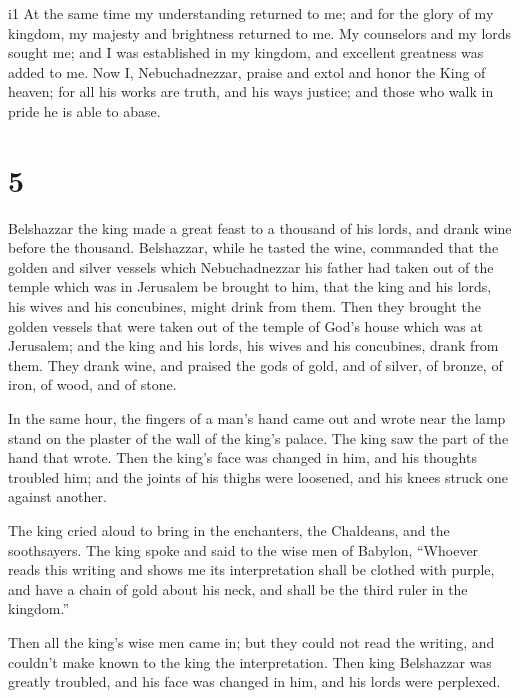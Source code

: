 i1 At the same time my understanding returned to me; and
for the glory of my kingdom, my majesty and brightness returned to me.
My counselors and my lords sought me; and I was established in my
kingdom, and excellent greatness was added to me.  Now I,
Nebuchadnezzar, praise and extol and honor the King of heaven; for all
his works are truth, and his ways justice; and those who walk in pride
he is able to abase.

\hypertarget{section-4}{%
\section{5}\label{section-4}}

 Belshazzar the king made a great feast to a thousand of his
lords, and drank wine before the thousand.  Belshazzar,
while he tasted the wine, commanded that the golden and silver vessels
which Nebuchadnezzar his father had taken out of the temple which was in
Jerusalem be brought to him, that the king and his lords, his wives and
his concubines, might drink from them.  Then they brought
the golden vessels that were taken out of the temple of God's house
which was at Jerusalem; and the king and his lords, his wives and his
concubines, drank from them.  They drank wine, and praised
the gods of gold, and of silver, of bronze, of iron, of wood, and of
stone.

 In the same hour, the fingers of a man's hand came out and
wrote near the lamp stand on the plaster of the wall of the king's
palace. The king saw the part of the hand that wrote.  Then
the king's face was changed in him, and his thoughts troubled him; and
the joints of his thighs were loosened, and his knees struck one against
another.

 The king cried aloud to bring in the enchanters, the
Chaldeans, and the soothsayers. The king spoke and said to the wise men
of Babylon, ``Whoever reads this writing and shows me its interpretation
shall be clothed with purple, and have a chain of gold about his neck,
and shall be the third ruler in the kingdom.''

 Then all the king's wise men came in; but they could not
read the writing, and couldn't make known to the king the
interpretation.  Then king Belshazzar was greatly troubled,
and his face was changed in him, and his lords were perplexed.

